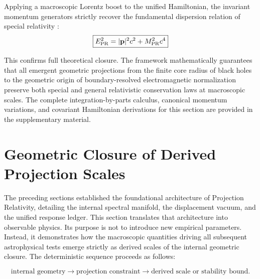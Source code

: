 \documentclass[11pt]{article}
\begin{document}
Applying a macroscopic Lorentz boost to the unified Hamiltonian, the invariant momentum generators strictly recover the fundamental dispersion relation of special relativity \cite{Einstein1905}:
\begin{equation}
\boxed{ E_{\rm PR}^2 = |\mathbf{p}|^2 c^2 + M_{\rm PR}^2 c^4 }
\end{equation}

This confirms full theoretical closure. The framework mathematically guarantees that all emergent geometric projections from the finite core radius of black holes to the geometric origin of boundary-resolved electromagnetic normalization preserve both special and general relativistic conservation laws \cite{Wald1984} at macroscopic scales. The complete integration-by-parts calculus, canonical momentum variations, and covariant Hamiltonian derivations for this section are provided in the supplementary material.

\section{Geometric Closure of Derived Projection Scales}
\label{sec:geometric_closure_projection_scales}
The preceding sections established the foundational architecture of Projection Relativity, detailing the internal spectral manifold, the displacement vacuum, and the unified response ledger. This section translates that architecture into observable physics. Its purpose is not to introduce new empirical parameters. Instead, it demonstrates how the macroscopic quantities driving all subsequent astrophysical tests emerge strictly as derived scales of the internal geometric closure. The deterministic sequence proceeds as follows:

\begin{equation}
\text{internal geometry}
\rightarrow
\text{projection constraint}
\rightarrow
\text{derived scale or stability bound}.
\end{equation}
\end{document}
